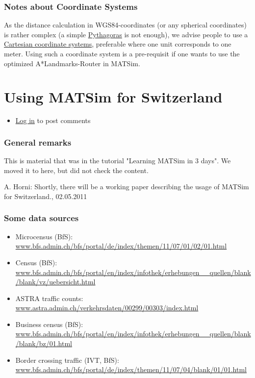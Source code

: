 \documentclass[a4paper,11pt]{report}
\begin{document}
\subsubsection{Notes about Coordinate Systems}

As the distance calculation in WGS84-coordinates (or any spherical coordinates) is rather complex (a simple \href{http://en.wikipedia.org/wiki/Pythagorean_theorem}{Pythagoras} is not enough), we advise people to use a \href{http://en.wikipedia.org/wiki/Coordinate_system}{Cartesian coordinate systems},  preferable where one unit corresponds to one meter. Using such a  coordinate system is a pre-requisit if one wants to use the optimized  A*Landmarks-Router in MATSim.

\vfill\eject
\section{Using MATSim for Switzerland}
\begin{itemize}
	\item \href{http://www.matsim.org/user/login?destination=comment/reply/580%23comment-form}{Log in} to post comments
\end{itemize}

\subsubsection{General remarks}

This is material that was in the tutorial "Learning MATSim in 3 days". We moved it to here, but did not check the content.

A. Horni: Shortly, there will be a working paper describing the usage of MATSim for Switzerland., 02.05.2011

\subsubsection{Some data sources}
\begin{itemize}
	\item Microcensus (BfS): \href{http://www.bfs.admin.ch/bfs/portal/de/index/themen/11/07/01/02/01.html}{www.bfs.admin.ch/bfs/portal/de/index/themen/11/07/01/02/01.html}
	\item Census (BfS): \href{http://www.bfs.admin.ch/bfs/portal/en/index/infothek/erhebungen__quellen/blank/blank/vz/uebersicht.html}{www.bfs.admin.ch/bfs/portal/en/index/infothek/erhebungen\_\_quellen/blank/blank/vz/uebersicht.html}
	\item ASTRA traffic counts: \href{http://www.astra.admin.ch/verkehrsdaten/00299/00303/index.html?lang=en}{www.astra.admin.ch/verkehrsdaten/00299/00303/index.html}
	\item Business census (BfS): \href{http://www.bfs.admin.ch/bfs/portal/en/index/infothek/erhebungen__quellen/blank/blank/bz/01.html}{www.bfs.admin.ch/bfs/portal/en/index/infothek/erhebungen\_\_quellen/blank/blank/bz/01.html}
	\item Border crossing traffic (IVT, BfS): \href{http://www.bfs.admin.ch/bfs/portal/de/index/themen/11/07/04/blank/01/01.html}{www.bfs.admin.ch/bfs/portal/de/index/themen/11/07/04/blank/01/01.html}
\end{itemize}
\end{document}
